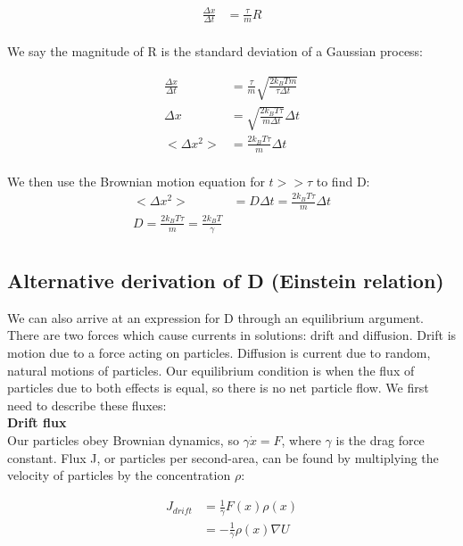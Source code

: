 \documentclass[10pt]{article} %
\begin{document}
\begin{align*}
  \frac{\Delta x}{\Delta t} &= \frac{\tau}{m} R\\
\end{align*}

We say the magnitude of R is the standard deviation of a Gaussian process:

\begin{align*}
  \frac{\Delta x}{\Delta t} &= \frac{\tau}{m}\sqrt{\frac{2k_BTm}{\tau \Delta t}}\\
  \Delta x &= \sqrt{\frac{2k_BT\tau}{m\Delta t}}\Delta t\\
  <\Delta x^2> &= \frac{2k_BT\tau}{m}\Delta t\\
\end{align*}

We then use the Brownian motion equation for $t >> \tau$ to find D:\\

\begin{align*}
  <\Delta x^2> &= D\Delta t = \frac{2k_BT\tau}{m}\Delta t\\
  D = \frac{2k_BT\tau}{m} = \frac{2k_BT}{\gamma}\\
\end{align*}

\subsection{Alternative derivation of D (Einstein relation)}
We can also arrive at an expression for D through an equilibrium argument. There are two forces which cause currents in solutions: drift and diffusion.
Drift is motion due to a force acting on particles. Diffusion is current due to random, natural motions of particles. Our equilibrium condition is when
the flux of particles due to both effects is equal, so there is no net particle flow. We first need to describe these fluxes:\\

\textbf{Drift flux}\\
Our particles obey Brownian dynamics, so $\gamma\dot{x} = F$, where $\gamma$ is the drag force constant. Flux J, or particles per second-area, can be
found by multiplying the velocity of particles by the concentration $\rho$:

\begin{align*}
  J_{drift} &= \frac{1}{\gamma}F(x)\rho(x)\\
  &= -\frac{1}{\gamma}\rho(x)\nabla U\\
\end{align*}
\end{document}
